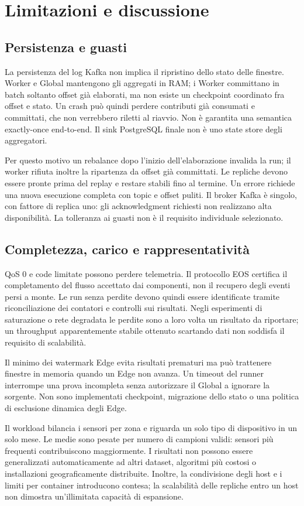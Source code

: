 \section{Limitazioni e discussione}
\label{sec:limiti}
\subsection{Persistenza e guasti}
La persistenza del log Kafka non implica il ripristino dello stato delle
finestre. Worker e Global mantengono gli aggregati in RAM; i Worker committano
in batch soltanto offset già elaborati, ma non esiste un checkpoint coordinato
fra offset e stato. Un crash può quindi perdere contributi già consumati e
committati, che non verrebbero riletti al riavvio. Non è garantita una
semantica exactly-once end-to-end. Il sink PostgreSQL finale non è uno
state store degli aggregatori.

Per questo motivo un rebalance dopo l'inizio dell'elaborazione invalida la
run; il worker rifiuta inoltre la ripartenza da offset già committati.
Le repliche devono essere pronte prima del replay e restare stabili fino al
termine. Un errore richiede una nuova esecuzione completa con topic e offset
puliti. Il broker Kafka è singolo, con fattore di replica uno: gli
acknowledgment richiesti non realizzano alta disponibilità. La tolleranza ai
guasti non è il requisito individuale selezionato.

\subsection{Completezza, carico e rappresentatività}
QoS 0 e code limitate possono perdere telemetria. Il protocollo EOS certifica
il completamento del flusso accettato dai componenti, non il recupero degli
eventi persi a monte. Le run senza perdite devono quindi essere identificate
tramite riconciliazione dei contatori e controlli sui risultati. Negli
esperimenti di saturazione o rete degradata le perdite sono a loro volta
un risultato da riportare; un throughput apparentemente stabile ottenuto
scartando dati non soddisfa il requisito di scalabilità.

Il minimo dei watermark Edge evita risultati prematuri ma può trattenere
finestre in memoria quando un Edge non avanza. Un timeout del runner
interrompe una prova incompleta senza autorizzare il Global a ignorare la
sorgente. Non sono implementati checkpoint, migrazione dello stato o una
politica di esclusione dinamica degli Edge.

Il workload bilancia i sensori per zona e riguarda un solo tipo di dispositivo
in un solo mese. Le medie sono pesate per numero di campioni validi: sensori
più frequenti contribuiscono maggiormente. I risultati non possono essere
generalizzati automaticamente ad altri dataset, algoritmi più costosi o
installazioni geograficamente distribuite. Inoltre, la condivisione degli
host e i limiti per container introducono contesa; la scalabilità delle
repliche entro un host non dimostra un'illimitata capacità di espansione.

